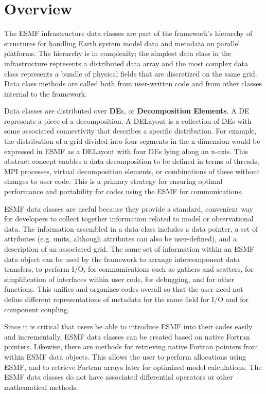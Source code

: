 
\section{Overview}

The ESMF infrastructure data classes are part of the framework's 
hierarchy of structures for handling Earth system model data and 
metadata on parallel platforms.  The hierarchy is in complexity; the 
simplest data class in the infrastructure represents a distributed data
array and the most complex data class represents a bundle of physical 
fields that are discretized on the same grid.  Data class methods 
are called both from user-written code and from other classes 
internal to the framework. 

Data classes are distributed over {\bf DE}s, or {\bf Decomposition Elements}.  
A DE represents a piece of a decomposition.  A DELayout is a collection
of DEs with some associated connectivity that describes a specific 
distribution.  For example, the distribution of a grid divided 
into four segments in the x-dimension would be expressed in ESMF as
a DELayout with four DEs lying along an x-axis. This abstract concept 
enables a data decomposition to be defined in 
terms of threads, MPI processes, virtual decomposition elements, or
combinations of these without changes to user code.  This is a
primary strategy for ensuring optimal performance and portability
for codes using the ESMF for communications.

ESMF data classes are useful because they provide a standard, 
convenient way for developers to collect together information 
related to model or observational data.  The information assembled 
in a data class includes a data pointer, a set of attributes 
(e.g. units, although attributes can also be user-defined), and a 
description of an associated grid.  The same set of information within 
an ESMF data object can be used by the framework to arrange 
intercomponent data transfers, to perform I/O, for communications
such as gathers and scatters, for simplification of interfaces 
within user code, for debugging, and for other functions.  
This unifies and organizes codes overall so that the user need not
define different representations of metadata for the same field 
for I/O and for component coupling.  

Since it is critical that users be able to introduce ESMF into their
codes easily and incrementally, ESMF data classes can be created based 
on native Fortran pointers.  Likewise, there are methods for retrieving 
native Fortran pointers from within ESMF data objects.  This allows
the user to perform allocations using ESMF, and to retrieve Fortran
arrays later for optimized model calculations.  The ESMF data classes 
do not have associated differential operators or other mathematical 
methods.

